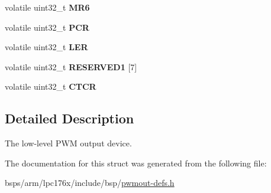 \begin{DoxyCompactItemize}
volatile uint32\+\_\+t {\bfseries M\+R6}
\item 
\mbox{\label{structlpc176x__pwm__device_ac96b7893d9023619d520e13f2f7ed04c}} 
volatile uint32\+\_\+t {\bfseries P\+CR}
\item 
\mbox{\label{structlpc176x__pwm__device_a2fc48a063297c80a9ee702ee3a39ebe1}} 
volatile uint32\+\_\+t {\bfseries L\+ER}
\item 
\mbox{\label{structlpc176x__pwm__device_a38a5941aa3586fa6f4c9ce259cc6ed46}} 
volatile uint32\+\_\+t {\bfseries R\+E\+S\+E\+R\+V\+E\+D1} \mbox{[}7\mbox{]}
\item 
\mbox{\label{structlpc176x__pwm__device_a445fff7297aeb8d6a334739feb536463}} 
volatile uint32\+\_\+t {\bfseries C\+T\+CR}
\end{DoxyCompactItemize}


\subsection{Detailed Description}
The low-\/level P\+WM output device. 

The documentation for this struct was generated from the following file\+:\begin{DoxyCompactItemize}
\item 
bsps/arm/lpc176x/include/bsp/\mbox{\hyperlink{pwmout-defs_8h}{pwmout-\/defs.\+h}}\end{DoxyCompactItemize}
